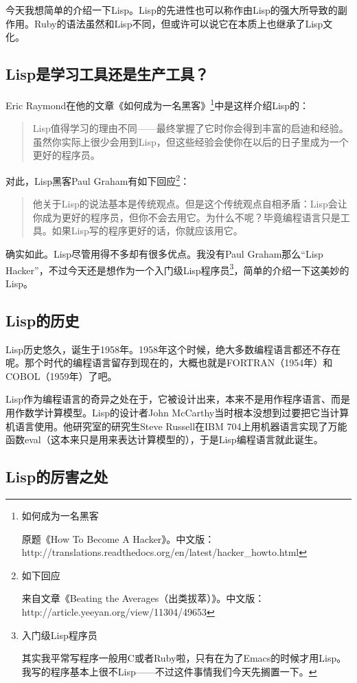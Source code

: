 \documentclass[a4paper,12pt]{article}
\begin{document}
今天我想简单的介绍一下Lisp。Lisp的先进性也可以称作由Lisp的强大所导致的副作用。Ruby的语法虽然和Lisp不同，但或许可以说它在本质上也继承了Lisp文化。

\subsection{Lisp是学习工具还是生产工具？}

Eric Raymond在他的文章《如何成为一名黑客》\footnote{如何成为一名黑客

  原题《How To Become A Hacker》。中文版：http://translations.readthedocs.org/en/latest/hacker\_howto.html}中是这样介绍Lisp的：
\begin{quote}
  Lisp值得学习的理由不同——最终掌握了它时你会得到丰富的启迪和经验。虽然你实际上很少会用到Lisp，但这些经验会使你在以后的日子里成为一个更好的程序员。
\end{quote}
对此，Lisp黑客Paul Graham有如下回应\footnote{如下回应

  来自文章《Beating the Averages（出类拔萃）》。中文版：http://article.yeeyan.org/view/11304/49653}：
\begin{quote}
  他关于Lisp的说法基本是传统观点。但是这个传统观点自相矛盾：Lisp会让你成为更好的程序员，但你不会去用它。为什么不呢？毕竟编程语言只是工具。如果Lisp写的程序更好的话，你就应该用它。
\end{quote}
确实如此。Lisp尽管用得不多却有很多优点。我没有Paul Graham那么“Lisp Hacker”，不过今天还是想作为一个入门级Lisp程序员\footnote{入门级Lisp程序员

其实我平常写程序一般用C或者Ruby啦，只有在为了Emacs的时候才用Lisp。我写的程序基本上很不Lisp——不过这件事情我们今天先搁置一下。}，简单的介绍一下这美妙的Lisp。

\subsection{Lisp的历史}
Lisp历史悠久，诞生于1958年。1958年这个时候，绝大多数编程语言都还不存在呢。那个时代的编程语言留存到现在的，大概也就是FORTRAN（1954年）和COBOL（1959年）了吧。

Lisp作为编程语言的奇异之处在于，它被设计出来，本来不是用作程序语言、而是用作数学计算模型。Lisp的设计者John McCarthy当时根本没想到过要把它当计算机语言使用。他研究室的研究生Steve Russell在IBM 704上用机器语言实现了万能函数eval（这本来只是用来表达计算模型的），于是Lisp编程语言就此诞生。

\subsection{Lisp的厉害之处}
\end{document}
